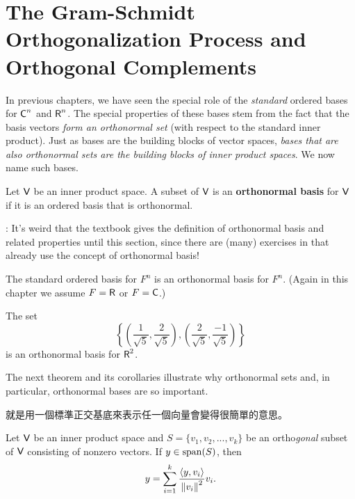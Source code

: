 \section{The Gram-Schmidt Orthogonalization Process and Orthogonal Complements} \label{sec 6.2}

In previous chapters, we have seen the special role of the \emph{standard} ordered bases for \(\textsf{C}^n\) and \(\textsf{R}^n\).
The special properties of these bases stem from the fact that the basis vectors \emph{form an orthonormal set} (with respect to the standard inner product).
Just as bases are the building blocks of vector spaces, \emph{bases that are also orthonormal sets are the building blocks of inner product spaces}.
We now name such bases.

\begin{definition} \label{def 6.5}
Let \(\textsf{V}\) be an inner product space.
A subset of \(\textsf{V}\) is an \textbf{orthonormal basis} for \(\textsf{V}\) if it is an ordered basis that is orthonormal.
\end{definition}

\begin{note}
: It's weird that the textbook gives the definition of orthonormal basis and related properties until this section, since there are (many) exercises in  that already use the concept of orthonormal basis!
\end{note}

\begin{example} \label{example 6.2.1}
The standard ordered basis for \(F^n\) is an orthonormal basis for \(F^n\).
(Again in this chapter we assume \(F = \textsf{R}\) or \(F = \textsf{C}\).)
\end{example}

\begin{example} \label{example 6.2.2}
The set
\[
    \left\{ \left( \frac{1}{\sqrt{5}}, \frac{2}{\sqrt{5}} \right), \left( \frac{2}{\sqrt{5}}, \frac{-1}{\sqrt{5}} \right) \right\}
\]
is an orthonormal basis for \(\textsf{R}^2\).
\end{example}

The next theorem and its corollaries illustrate why orthonormal sets and, in particular, orthonormal bases are so important.

\begin{note}
就是用一個標準正交基底來表示任一個向量會變得很簡單的意思。
\end{note}

\begin{theorem} \label{thm 6.3}
Let \(\textsf{V}\) be an inner product space and \(S = \{ v_1, v_2, ..., v_k \}\) be an ortho\emph{gonal} subset of \(\textsf{V}\) consisting of nonzero vectors.
If \(y \in \operatorname{span}(S)\), then
\[
    y = \sum_{i = 1}^k \frac{\left< y, v_i \right>}{\left\lVert v_i\right\rVert^2} v_i.
\]
\end{theorem}

